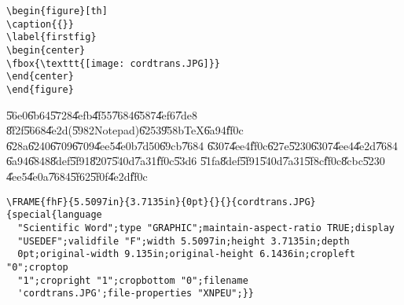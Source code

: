 \begin{mdframed}[leftline=false, rightline=false,backgroundcolor=bg]
\begin{verbatim}
\begin{figure}[th]
\caption{{}}
\label{firstfig}
\begin{center}
\fbox{\texttt{[image: cordtrans.JPG]}}
\end{center}
\end{figure}
\end{verbatim}
\end{mdframed}

\U{56e0}\U{6b64}\U{5728}\U{4efb}\U{4f55}\U{7684}\U{6587}\U{4ef6}\U{7de8}%
\U{8f2f}\U{5668}\U{4e2d}(\U{5982}Notepad)\U{6253}\U{958b}TeX\U{6a94}\U{ff0c}%
\U{628a}\U{6240}\U{6709}\U{6709}\U{4ee5}\U{4e0b}\U{7d50}\U{69cb}\U{7684}%
\U{6307}\U{4ee4}\U{ff0c}\U{627e}\U{5230}\U{6307}\U{4ee4}\U{4e2d}\U{7684}%
\U{6a94}\U{6848}\U{8def}\U{5f91}\U{8207}\U{540d}\U{7a31}\U{ff0c}\U{53d6}%
\U{51fa}\U{8def}\U{5f91}\U{540d}\U{7a31}\U{5f8c}\U{ff0c}\U{8cbc}\U{5230}%
\U{4ee5}\U{4e0a}\U{7684}\U{5f62}\U{5f0f}\U{4e2d}\U{ff0c}

\begin{mdframed}[leftline=false, rightline=false,backgroundcolor=bg]
\begin{verbatim}
\FRAME{fhF}{5.5097in}{3.7135in}{0pt}{}{}{cordtrans.JPG}{special{language
  "Scientific Word";type "GRAPHIC";maintain-aspect-ratio TRUE;display
  "USEDEF";validfile "F";width 5.5097in;height 3.7135in;depth
  0pt;original-width 9.135in;original-height 6.1436in;cropleft "0";croptop
  "1";cropright "1";cropbottom "0";filename
  'cordtrans.JPG';file-properties "XNPEU";}}
\end{verbatim}
\end{mdframed}

